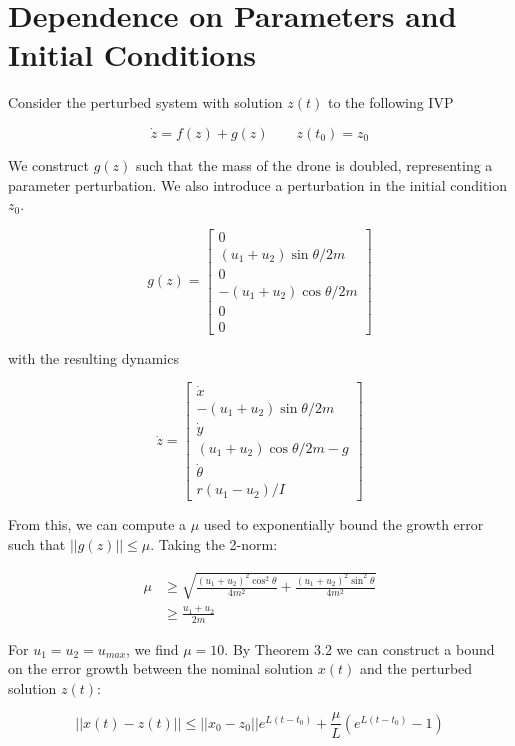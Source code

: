 \section{\textbf{Dependence on Parameters and Initial Conditions}}

\noindent Consider the perturbed system with solution $z(t)$ to the following IVP

\[ \dot{z} = f(z) + g(z) \quad\quad z(t_0) = z_0 \]

\noindent We construct $g(z)$ such that the mass of the drone is doubled, representing a parameter perturbation. We also introduce a perturbation in the initial condition $z_0$.

\[ g(z) = \begin{bmatrix}
    0 \\
    (u_1 + u_2)\sin\theta / 2m \\
    0 \\
    -(u_1 + u_2)\cos\theta / 2m \\
    0 \\
    0
\end{bmatrix} \]

\noindent with the resulting dynamics

\[ \dot{z} = \begin{bmatrix}
    \dot{x} \\
    -(u_1 + u_2) \sin\theta / 2m \\
    \dot{y} \\
    (u_1 + u_2) \cos\theta / 2m - g \\
    \dot{\theta} \\
    r(u_1 - u_2) / I
\end{bmatrix}  \]

\noindent From this, we can compute a $\mu$ used to exponentially bound the growth error such that $||g(z)|| \leq \mu$. Taking the 2-norm:

\[ \begin{aligned}
    \mu &\geq \sqrt{\frac{(u_1+u_2)^2 \cos^2\theta}{4m^2} + \frac{(u_1+u_2)^2 \sin^2\theta}{4m^2}} \\
        &\geq \frac{u_1 + u_2}{2m}
\end{aligned} \]

\noindent For $u_1 = u_2 = u_{max}$, we find $\mu = 10$. By Theorem 3.2 we can construct a bound on the error growth between the nominal solution $x(t)$ and the perturbed solution $z(t)$:

\[ ||x(t) - z(t) || \leq ||x_0 - z_0|| e^{L(t - t_0)} + \frac{\mu}{L}(e^{L(t - t_0)} - 1) \]


